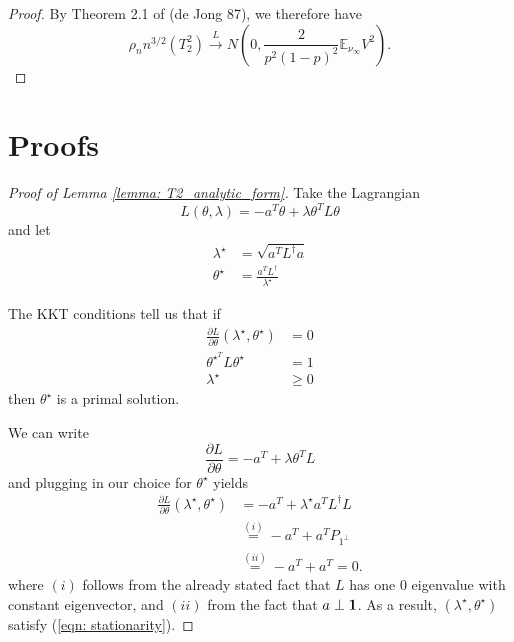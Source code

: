 \documentclass{article}
\newcommand{\Linv}{L^{\dagger}}
\theoremstyle{alden}
\theoremstyle{definition}
\theoremstyle{remark}
\begin{document}
\begin{proof}
	By Theorem 2.1 of (de Jong 87), we therefore have
	\begin{equation*}
	\rho_n n^{3/2} (T_2^2) \overset{L}{\to} N(0, \frac{2}{p^2(1-p)^2}\mathbb{E}_{\nu_{\infty}}{V^2}).
	\end{equation*}
\end{proof}

\section{Proofs}
\begin{proof}[Proof of Lemma \ref{lemma: T2_analytic_form}]
	Take the Lagrangian
	\begin{equation*}
	L(\theta, \lambda) = - a^T \theta + \lambda \theta^T L \theta
	\end{equation*}
	and let
	\begin{align*}
	\lambda^{\star} & = \sqrt{a^T \Linv a} \\
	\theta^{\star} & = \frac{a^T \Linv}{\lambda^{\star}}
	\end{align*}
	
	The KKT conditions tell us that if
	\begin{align}
	\frac{\partial L}{\partial \theta}(\lambda^{\star}, \theta^{\star}) & = 0 \label{eqn: stationarity}\\
	{\theta}^{\star^{T}} L \theta^{\star} & = 1 \label{eqn : complementary_slackness} \\
	\lambda^{\star} & \geq 0 \label{eqn: dual_feasibility}
	\end{align}
	then $\theta^{\star}$ is a primal solution.
	
	 We can write
	\begin{equation*}
	\frac{\partial L}{\partial \theta} = -a^T + \lambda \theta^T L
	\end{equation*}
	and plugging in our choice for $\theta^{\star}$ yields
	\begin{align*}
	\frac{\partial L}{\partial \theta}(\lambda^{\star}, \theta^{\star}) & = -a^T + \lambda^{\star} a^T \Linv L \\
	& \overset{(i)}{=} -a^T + a^T P_{1^{\perp}} \\
	& \overset{(ii)}{=} -a^T + a^T = 0.
	\end{align*}
	where $(i)$ follows from the already stated fact that $L$ has one $0$ eigenvalue with constant eigenvector, and $(ii)$ from the fact that $a \perp {\bf 1}$. As a result, $(\lambda^{\star}, \theta^{\star})$ satisfy (\ref{eqn: stationarity}). 
	

\end{proof}
\end{document}
